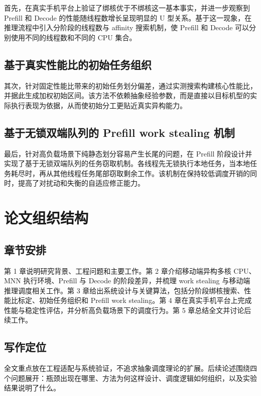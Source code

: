首先，在真实手机平台上验证了绑核优于不绑核这一基本事实，并进一步观察到 Prefill 和 Decode 的性能随线程数增长呈现明显的 U 型关系。基于这一现象，在推理流程中引入分阶段的线程数与 affinity 搜索机制，使 Prefill 和 Decode 可以分别使用不同的线程数和不同的 CPU 集合。

\subsection{基于真实性能比的初始任务组织}

其次，针对固定性能比带来的初始任务划分偏差，通过实测搜索构建核心性能比，并据此生成加权初始区间。该方法不依赖抽象经验参数，而是直接以目标机型的实际执行表现为依据，从而使初始分工更贴近真实异构能力。

\subsection{基于无锁双端队列的 Prefill work stealing 机制}

最后，针对高负载场景下纯静态划分容易产生长尾的问题，在 Prefill 阶段设计并实现了基于无锁双端队列的任务窃取机制。各线程先无锁执行本地任务，当本地任务耗尽时，再从其他线程任务尾部窃取剩余工作。该机制在保持较低调度开销的同时，提高了对扰动和失衡的自适应修正能力\cite{blumofe1999workstealing,chase2005deque,le2013weakmemory}。

\section{论文组织结构}

\subsection{章节安排}

第 1 章说明研究背景、工程问题和主要工作。第 2 章介绍移动端异构多核 CPU、MNN 执行环境、Prefill 与 Decode 的阶段差异，并梳理 work stealing 与移动端推理调度相关工作。第 3 章给出系统设计与关键算法，包括分阶段绑核搜索、性能比标定、初始任务组织和 Prefill work stealing。第 4 章在真实手机平台上完成性能与稳定性评估，并分析高负载场景下的调度行为。第 5 章总结全文并讨论后续工作。

\subsection{写作定位}

全文重点放在工程适配与系统验证，不追求抽象调度理论的扩展。后续论述围绕四个问题展开：瓶颈出现在哪里、方法为何这样设计、调度逻辑如何组织，以及实验结果说明了什么。
